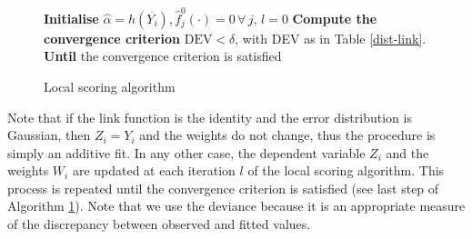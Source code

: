 \begin{figure}[ht!]
\SetAlgoLined
\caption{Local scoring algorithm}
\label{local-scoring}
\textbf{Initialise} $\hat \alpha = h(\overline{Y_i}), \hat f_j^0 (\cdot) = 0 \, \forall \, j, \, l = 0 $ \BlankLine
{}
    \BlankLine
\textbf{Compute the convergence criterion} $\text{DEV} < \delta$, with DEV as in Table \ref{dist-link}. \BlankLine
\textbf{Until} the convergence criterion is satisfied \BlankLine
\end{figure}

Note that if the link function is the identity and the error distribution is Gaussian,  then $Z_i = Y_i$ and the weights do not change, thus the procedure is simply an additive fit. In any other case, the dependent variable $Z_i$ and the weights $W_i$ are updated at each iteration $l$  of the local scoring algorithm. This process is repeated until the convergence criterion is satisfied (see last step of Algorithm \ref{local-scoring}). Note that we use the deviance because it is an appropriate measure of the discrepancy between observed and fitted values. 

